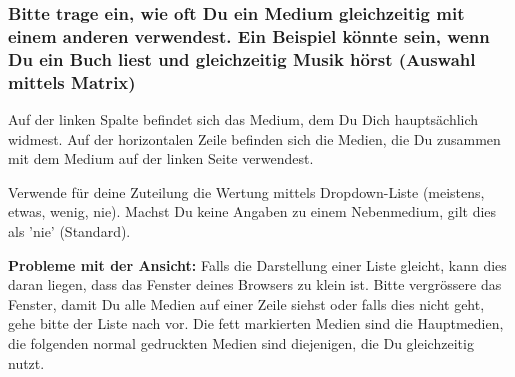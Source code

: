 \subsubsection*{Bitte trage ein, wie oft Du ein Medium gleichzeitig mit einem anderen verwendest. Ein Beispiel könnte sein, wenn Du ein Buch liest und gleichzeitig Musik hörst (Auswahl mittels Matrix)}
Auf der linken Spalte befindet sich das Medium, dem Du Dich hauptsächlich widmest. Auf der horizontalen Zeile befinden sich die Medien, die Du zusammen mit dem Medium auf der linken Seite verwendest.\par
Verwende für deine Zuteilung die Wertung mittels Dropdown-Liste (meistens, etwas, wenig, nie). Machst Du keine Angaben zu einem Nebenmedium, gilt dies als 'nie' (Standard).\par
\textbf{Probleme mit der Ansicht:} Falls die Darstellung einer Liste gleicht, kann dies daran liegen, dass das Fenster deines Browsers zu klein ist. Bitte vergrössere das Fenster, damit Du alle Medien auf einer Zeile siehst oder falls dies nicht geht, gehe bitte der Liste nach vor. Die fett markierten Medien sind die Hauptmedien, die folgenden normal gedruckten Medien sind diejenigen, die Du gleichzeitig nutzt.\par
